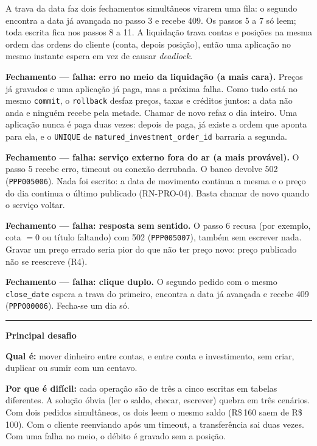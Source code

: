 \documentclass[11pt,a4paper]{article}
\newcommand{\tb}[1]{\texttt{#1}}
\newcommand{\rs}{R\$\,}
\begin{document}
A trava da data faz dois fechamentos simultâneos virarem uma fila: o segundo encontra a data já
avançada no passo 3 e recebe 409. Os passos 5 a 7 só leem; toda escrita fica nos passos 8 a 11.
A liquidação trava contas e posições na mesma ordem das ordens do cliente (conta, depois
posição), então uma aplicação no mesmo instante espera em vez de causar \emph{deadlock}.

\textbf{Fechamento --- falha: erro no meio da liquidação (a mais cara).} Preços já gravados e uma
aplicação já paga, mas a próxima falha. Como tudo está no mesmo \tb{commit}, o \tb{rollback}
desfaz preços, taxas e créditos juntos: a data não anda e ninguém recebe pela metade. Chamar de
novo refaz o dia inteiro. Uma aplicação nunca é paga duas vezes: depois de paga, já existe a ordem
que aponta para ela, e o \tb{UNIQUE} de \tb{matured_investment_order_id} barraria a segunda.

\textbf{Fechamento --- falha: serviço externo fora do ar (a mais provável).} O passo 5 recebe
erro, timeout ou conexão derrubada. O banco devolve 502 (\tb{PPP005006}). Nada foi escrito: a data
de movimento continua a mesma e o preço do dia continua o último publicado (RN-PRO-04). Basta
chamar de novo quando o serviço voltar.

\textbf{Fechamento --- falha: resposta sem sentido.} O passo 6 recusa (por exemplo, cota $= 0$ ou
título faltando) com 502 (\tb{PPP005007}), também sem escrever nada. Gravar um preço errado seria
pior do que não ter preço novo: preço publicado não se reescreve (R4).

\textbf{Fechamento --- falha: clique duplo.} O segundo pedido com o mesmo \tb{close_date} espera a
trava do primeiro, encontra a data já avançada e recebe 409 (\tb{PPP000006}). Fecha-se um dia só.

\bigskip
\hrule
\medskip
\textbf{Principal desafio}

\textbf{Qual é:} mover dinheiro entre contas, e entre conta e investimento, sem criar,
duplicar ou sumir com um centavo.

\textbf{Por que é difícil:} cada operação são de três a cinco escritas em tabelas diferentes. A
solução óbvia (ler o saldo, checar, escrever) quebra em três cenários. Com dois pedidos
simultâneos, os dois leem o mesmo saldo (\rs 160 saem de \rs 100). Com o cliente reenviando após um
timeout, a transferência sai duas vezes. Com uma falha no meio, o débito é gravado sem a posição.
\end{document}
